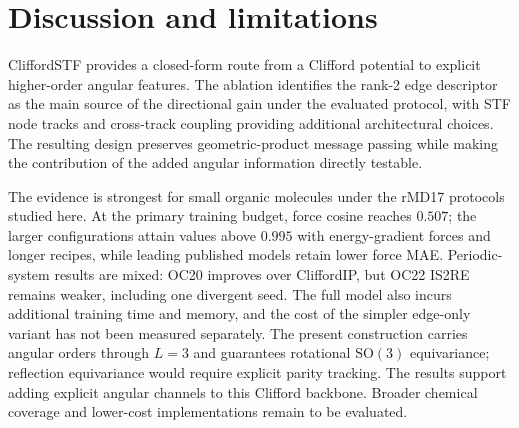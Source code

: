 \section{Discussion and limitations}\label{sec:limitations}

CliffordSTF provides a closed-form route from a Clifford potential to explicit higher-order angular features. The ablation identifies the rank-2 edge descriptor as the main source of the directional gain under the evaluated protocol, with STF node tracks and cross-track coupling providing additional architectural choices. The resulting design preserves geometric-product message passing while making the contribution of the added angular information directly testable.

The evidence is strongest for small organic molecules under the rMD17 protocols studied here. At the primary training budget, force cosine reaches $0.507$; the larger configurations attain values above $0.995$ with energy-gradient forces and longer recipes, while leading published models retain lower force MAE. Periodic-system results are mixed: OC20 improves over CliffordIP, but OC22 IS2RE remains weaker, including one divergent seed. The full model also incurs additional training time and memory, and the cost of the simpler edge-only variant has not been measured separately. The present construction carries angular orders through $L{=}3$ and guarantees rotational $\mathrm{SO}(3)$ equivariance; reflection equivariance would require explicit parity tracking. The results support adding explicit angular channels to this Clifford backbone. Broader chemical coverage and lower-cost implementations remain to be evaluated.
